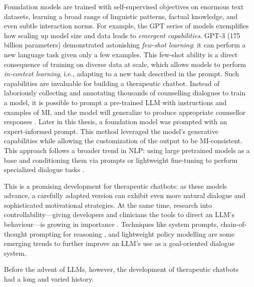Foundation models are trained with self-supervised objectives on enormous text datasets, learning a broad range of linguistic patterns, factual knowledge, and even subtle interaction norms. For example, the GPT series of models exemplifies how scaling up model size and data leads to \emph{emergent capabilities}. GPT-3 \cite{brown2020language} (175 billion parameters) demonstrated astonishing \emph{few-shot learning}: it can perform a new language task given only a few examples. This few-shot ability is a direct consequence of training on diverse data at scale, which allows models to perform \emph{in-context learning}, i.e., adapting to a new task described in the prompt. Such capabilities are invaluable for building a therapeutic chatbot. Instead of laboriously collecting and annotating thousands of counselling dialogues to train a model, it is possible to prompt a pre-trained LLM with instructions and examples of MI, and the model will generalize to produce appropriate counsellor responses \cite{xie-etal-2024-shot-dialogue}. Later in this thesis, a foundation model was prompted with an expert-informed prompt. This method leveraged the model's generative capabilities while allowing the customization of the output to be MI-consistent. This approach follows a broader trend in NLP: using large pretrained models as a base and conditioning them via prompts or lightweight fine-tuning to perform specialized dialogue tasks \cite{10.5555/3600270.3602070}.


This is a promising development for therapeutic chatbots: as these models advance, a carefully adapted version can exhibit even more natural dialogue and sophisticated motivational strategies. At the same time, research into controllability---giving developers and clinicians the tools to direct an LLM's behaviour---is growing in importance \cite{fernandez-etal-2025-lamia}. Techniques like system prompts, chain-of-thought prompting for reasoning \cite{10.5555/3600270.3602070}, and lightweight policy modelling \cite{du-etal-2024-rewarding} are some emerging trends to further improve an LLM's use as a goal-oriented dialogue system.

Before the advent of LLMs, however, the development of therapeutic chatbots had a long and varied history.


